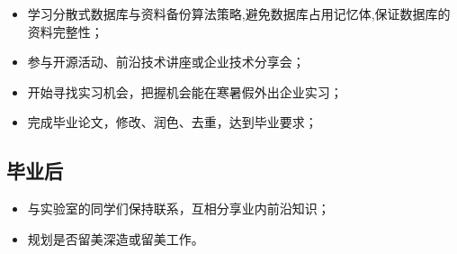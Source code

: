 \documentclass{article}
\begin{document}
\begin{bibunit}[alpha]
	\begin{itemize}[parsep=0.5ex]
	\item 学习分散式数据库与资料备份算法策略,避免数据库占用记忆体,保证数据库的资料完整性；
	\item 参与开源活动、前沿技术讲座或企业技术分享会；
	\item 开始寻找实习机会，把握机会能在寒暑假外出企业实习；
	\item 完成毕业论文，修改、润色、去重，达到毕业要求；
	\end{itemize}

\subsection{毕业后}

\begin{itemize}[parsep=0.5ex]
\item 与实验室的同学们保持联系，互相分享业内前沿知识；
\item 规划是否留美深造或留美工作。
\end{itemize}

\end{bibunit}
\end{document}
